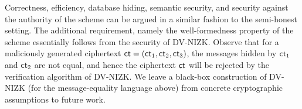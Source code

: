 Correctness, efficiency, database hiding, semantic security, and security against the authority of the scheme can be argued in a similar fashion to the semi-honest setting. The additional requirement, namely the well-formedness property of the scheme essentially follows from the security of DV-NIZK. Observe that for a maliciously generated ciphertext $\mathsf{ct} = (\mathsf{ct}_1, \mathsf{ct}_2, \mathsf{ct}_3)$, the messages hidden by $\mathsf{ct}_1$ and $\mathsf{ct}_2$ are not equal, and hence the ciphertext $\mathsf{ct}$ will be rejected by the verification algorithm of DV-NIZK. We leave a black-box construction of DV-NIZK (for the message-equality language above) from concrete cryptographic assumptions to future work.
